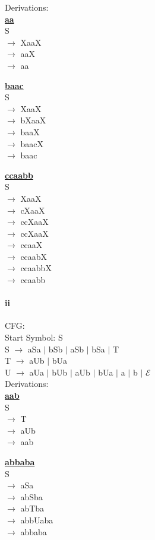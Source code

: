 \documentclass[10pt,letter]{article}
\begin{document}
Derivations: \\
\textbf{\underline{aa}} \\
S\\
$\rightarrow$ XaaX \\
$\rightarrow$ aaX \\
$\rightarrow$ aa

\textbf{\underline{baac}} \\
S\\
$\rightarrow$ XaaX \\
$\rightarrow$ bXaaX \\
$\rightarrow$ baaX \\
$\rightarrow$ baacX \\
$\rightarrow$ baac 

\textbf{\underline{ccaabb}} \\ 
S\\
$\rightarrow$ XaaX \\
$\rightarrow$ cXaaX \\
$\rightarrow$ ccXaaX \\
$\rightarrow$ ccXaaX \\
$\rightarrow$ ccaaX \\
$\rightarrow$ ccaabX \\
$\rightarrow$ ccaabbX \\
$\rightarrow$ ccaabb 


\paragraph{ii} CFG: \\
Start Symbol: S\\
S $\rightarrow$ aSa $\mid$ bSb $\mid$ aSb $\mid$ bSa $\mid$ T \\
T $\rightarrow$ aUb $\mid$ bUa \\
U $\rightarrow$ aUa $\mid$ bUb $\mid$ aUb $\mid$ bUa $\mid$ a $\mid$ b $\mid$ $\mathcal{E}$ \\

Derivations: \\
\textbf{\underline{aab}} \\
S\\
$\rightarrow$ T \\
$\rightarrow$ aUb \\
$\rightarrow$ aab 

\textbf{\underline{abbaba}} \\
S\\
$\rightarrow$ aSa \\
$\rightarrow$ abSba \\
$\rightarrow$ abTba \\
$\rightarrow$ abbUaba \\
$\rightarrow$ abbaba \\
\end{document}
